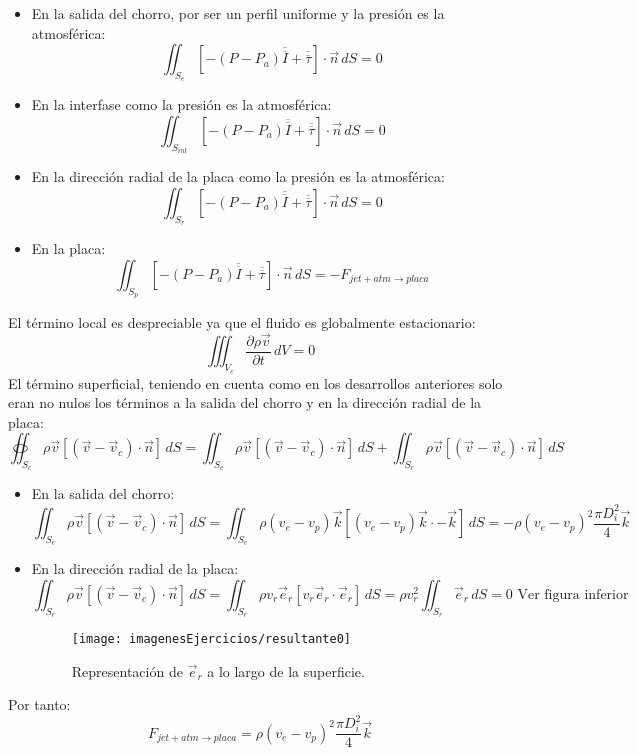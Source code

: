 \begin{enumerate}
{	\begin{itemize}
		\item En la salida del chorro, por ser un perfil uniforme y la presión es la atmosférica:
			\[\iint_{S_e}\left[-(P-P_a)\overline{\overline{I}}+\overline{\overline{\tau}}\right]\cdot\vec{n}\,dS=0\]
		\item En la interfase como la presión es la atmosférica:
			\[\iint_{S_{int}}\left[-(P-P_a)\overline{\overline{I}}+\overline{\overline{\tau}}\right]\cdot\vec{n}\,dS=0\]
		\item En la dirección radial de la placa como la presión es la atmosférica:
			\[\iint_{S_r}\left[-(P-P_a)\overline{\overline{I}}+\overline{\overline{\tau}}\right]\cdot\vec{n}\,dS=0\]
		\item En la placa:
			\[\iint_{S_p}\left[-(P-P_a)\overline{\overline{I}}+\overline{\overline{\tau}}\right]\cdot\vec{n}\,dS=-F_{jet+atm\rightarrow placa}\]
	\end{itemize}
	El término local es despreciable ya que el fluido es globalmente estacionario:
		\[\iiint_{V_c}\dfrac{\partial \rho\vec{v}}{\partial t}\,dV=0\]
	El término superficial, teniendo en cuenta como en los desarrollos anteriores solo eran no nulos los términos a la salida del chorro y en la dirección radial de la placa:
		\[\oiint_{S_c}\rho\vec{v}\left[\left(\vec{v}-\vec{v}_c\right)\cdot\vec{n}\right]\,dS=
		\iint_{S_e}\rho\vec{v}\left[\left(\vec{v}-\vec{v}_c\right)\cdot\vec{n}\right]\,dS
		+
		\iint_{S_r}\rho\vec{v}\left[\left(\vec{v}-\vec{v}_c\right)\cdot\vec{n}\right]\,dS\]
	\begin{itemize}
		\item En la salida del chorro:
			\[\iint_{S_e}\rho\vec{v}\left[\left(\vec{v}-\vec{v}_c\right)\cdot\vec{n}\right]\,dS=
			\iint_{S_e}\rho \left(v_e-v_p\right) \vec{k}\left[\left(v_e-v_p\right) \vec{k}\cdot-\vec{k}\right]\,dS=-\rho\left(v_e-v_p\right)^2\dfrac{\pi D^2_i}{4}\vec{k}\]
		\item En la dirección radial de la placa:
			\[\iint_{S_r}\rho\vec{v}\left[\left(\vec{v}-\vec{v}_c\right)\cdot\vec{n}\right]\,dS=
			\iint_{S_r}\rho v_r \vec{e}_r\left[v_r \vec{e}_r\cdot\vec{e}_r\right]\,dS=\rho v^2_r\iint_{S_r}\vec{e}_r\,dS=0 \text{ Ver figura inferior}\]
		\begin{figure}[H]
			\centering
			\texttt{[image: imagenesEjercicios/resultante0]}
			\caption{Representación de $\vec{e}_r$ a lo largo de la superficie.}
			\label{fig:resultante0}
		\end{figure}
	\end{itemize}
	Por tanto:
		\[F_{jet+atm\rightarrow placa}=\rho\left(v_e-v_p\right)^2\dfrac{\pi D^2_i}{4}\vec{k}\]
}


\end{enumerate}
